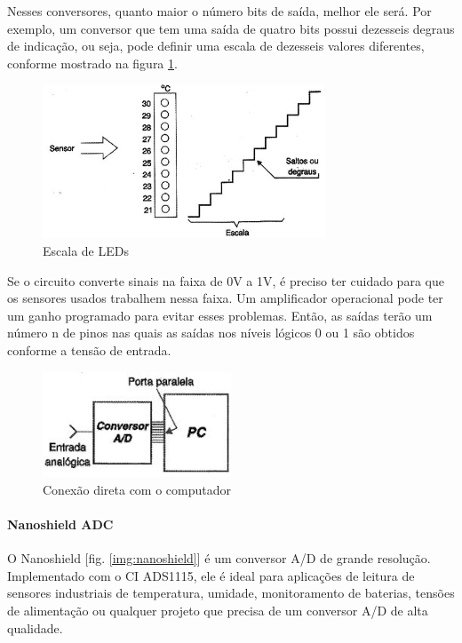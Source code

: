 			Nesses conversores, quanto maior o número bits de saída, melhor ele será. Por exemplo, um conversor que tem uma saída de quatro bits possui dezesseis degraus de indicação, ou seja, pode definir uma escala de dezesseis valores diferentes, conforme mostrado na figura \ref{img:escalaLEDs}.

			\begin{figure}[h]
        \centering
        \includegraphics[width=0.75\textwidth]{figuras/escalaLEDs}
        \caption{Escala de LEDs}
        \label{img:escalaLEDs}
      \end{figure}

			Se o circuito converte sinais na faixa de 0V a 1V, é preciso ter cuidado para que os sensores usados trabalhem nessa faixa. Um amplificador operacional pode ter um ganho programado para evitar esses problemas. Então, as saídas terão um número n de pinos nas quais as saídas nos níveis lógicos 0 ou 1 são obtidos conforme a tensão de entrada.

			\begin{figure}[h]
        \centering
        \includegraphics[width=0.5\textwidth]{figuras/conexaoPC}
        \caption{Conexão direta com o computador}
        \label{img:conxaoPC}
      \end{figure}

      \paragraph{Nanoshield ADC}

			O Nanoshield [fig. \ref{img:nanoshield}] é um conversor A/D de grande resolução. Implementado com o CI ADS1115, ele é ideal para aplicações de leitura de sensores industriais de temperatura, umidade, monitoramento de baterias, tensões de alimentação ou qualquer projeto que precisa de um conversor A/D de alta qualidade.

